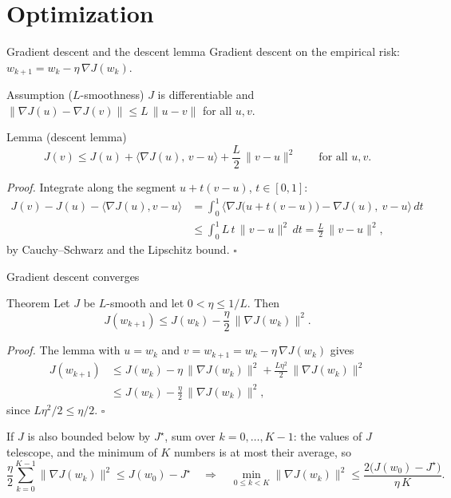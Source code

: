 \documentclass[10pt]{beamer}
\begin{document}


\section{Optimization}


\begin{frame}{Gradient descent and the descent lemma}
\small
Gradient descent on the empirical risk: $w_{k+1}=w_k-\eta\,\nabla J(w_k)$.
\begin{mathbox}[assumption]{Assumption ($L$-smoothness)}
$J$ is differentiable and $\|\nabla J(u)-\nabla J(v)\|\le L\,\|u-v\|$ for all $u,v$.
\end{mathbox}
\begin{mathbox}{Lemma (descent lemma)}
\[
J(v)\le J(u)+\langle\nabla J(u),\,v-u\rangle+\frac L2\,\|v-u\|^2\qquad\text{for all }u,v.
\]
\end{mathbox}
\emph{Proof.} Integrate along the segment $u+t(v-u)$, $t\in[0,1]$:
\[
\begin{aligned}
J(v)-J(u)-\langle\nabla J(u),v-u\rangle&=\int_0^1\big\langle\nabla J\big(u+t(v-u)\big)-\nabla J(u),\ v-u\big\rangle\,dt\\
&\le\int_0^1L\,t\,\|v-u\|^2\,dt=\frac L2\,\|v-u\|^2,
\end{aligned}
\]
by Cauchy--Schwarz and the Lipschitz bound. \hfill$\square$
\end{frame}


\begin{frame}{Gradient descent converges}
\small
\begin{mathbox}{Theorem}
Let $J$ be $L$-smooth and let $0<\eta\le1/L$. Then
\[
J(w_{k+1})\le J(w_k)-\frac\eta2\,\|\nabla J(w_k)\|^2.
\]
\end{mathbox}
\emph{Proof.} The lemma with $u=w_k$ and $v=w_{k+1}=w_k-\eta\,\nabla J(w_k)$ gives
\[
\begin{aligned}
J(w_{k+1})&\le J(w_k)-\eta\,\|\nabla J(w_k)\|^2+\frac{L\eta^2}{2}\,\|\nabla J(w_k)\|^2\\
&\le J(w_k)-\frac\eta2\,\|\nabla J(w_k)\|^2,
\end{aligned}
\]
since $L\eta^2/2\le\eta/2$. \hfill$\square$

If $J$ is also bounded below by $J^\star$, sum over $k=0,\dots,K-1$: the values of $J$ telescope,
and the minimum of $K$ numbers is at most their average, so
\[
\frac\eta2\sum_{k=0}^{K-1}\|\nabla J(w_k)\|^2\le J(w_0)-J^\star
\quad\Longrightarrow\quad
\min_{0\le k<K}\|\nabla J(w_k)\|^2\le\frac{2\big(J(w_0)-J^\star\big)}{\eta\,K}.
\]

\end{frame}
\end{document}

